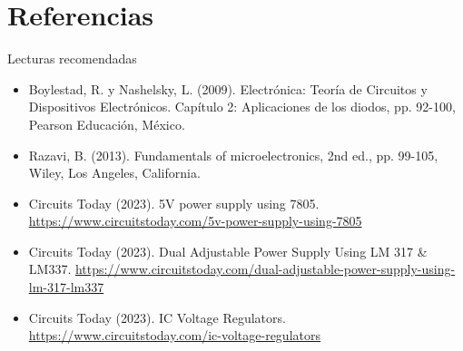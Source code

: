 \documentclass[t,aspectratio=169]{beamer}
\begin{document}
\section{Referencias}
\begin{frame}{Lecturas recomendadas}

\begin{itemize}
    \item Boylestad, R. y Nashelsky, L. (2009). Electrónica: Teoría de Circuitos y Dispositivos Electrónicos. Capítulo 2: Aplicaciones de los diodos, pp. 92-100, Pearson Educación, México.
    \item Razavi, B. (2013). Fundamentals of microelectronics, 2nd ed., pp. 99-105, Wiley, Los Angeles, California.
    \item Circuits Today (2023). 5V power supply using 7805. \url{https://www.circuitstoday.com/5v-power-supply-using-7805}
    \item Circuits Today (2023). Dual Adjustable Power Supply Using LM 317 \& LM337. \url{https://www.circuitstoday.com/dual-adjustable-power-supply-using-lm-317-lm337}
    \item Circuits Today (2023). IC Voltage Regulators. \url{https://www.circuitstoday.com/ic-voltage-regulators}
\end{itemize}

\end{frame}
\end{document}
